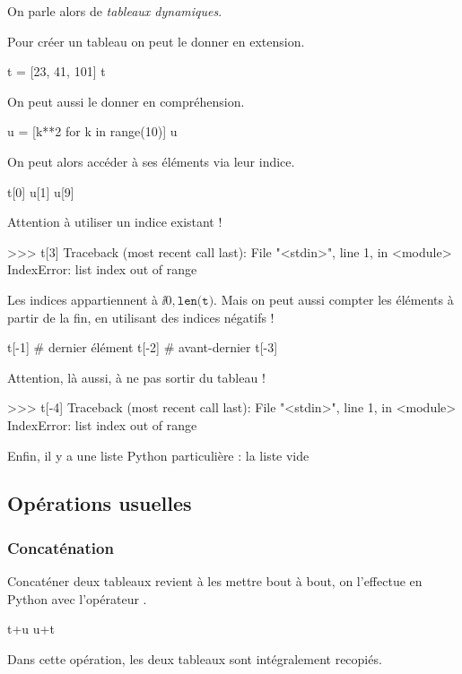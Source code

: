 On parle alors de \emph{tableaux dynamiques}.


Pour créer un tableau on peut le donner en extension.

\begin{pyconsole}
t = [23, 41, 101]
t
\end{pyconsole}

On peut aussi le donner en compréhension.

\begin{pyconsole}
u = [k**2 for k in range(10)]
u
\end{pyconsole}
On peut alors accéder à ses éléments via leur indice.
\begin{pyconsole}
t[0]
u[1]
u[9]
\end{pyconsole}

Attention à utiliser un indice existant !
\begin{pyverbatim}
>>> t[3]
Traceback (most recent call last):
  File "<stdin>", line 1, in <module>
IndexError: list index out of range
\end{pyverbatim}

Les indices appartiennent à $\ii{0,\texttt{len(t)}}$.
Mais on peut aussi compter les éléments à partir de la fin, en utilisant des indices négatifs !
\begin{pyconsole}
t[-1] # dernier élément
t[-2] # avant-dernier
t[-3]
\end{pyconsole}

Attention, là aussi, à ne pas sortir du tableau !

\begin{pyverbatim}
>>> t[-4]
Traceback (most recent call last):
  File "<stdin>", line 1, in <module>
IndexError: list index out of range
\end{pyverbatim}

Enfin, il y a une liste Python particulière : la liste vide \pyv{[]}

\subsection{Opérations usuelles}

\subsubsection{Concaténation}
Concaténer deux tableaux revient à les mettre bout à bout, on l'effectue en Python avec 
l'opérateur \pyv{+}.
\begin{pyconsole}
t+u
u+t
\end{pyconsole}
Dans cette opération, les deux tableaux sont intégralement recopiés. 

